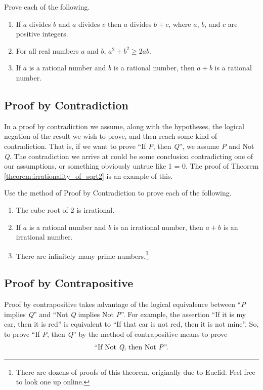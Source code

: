 \begin{exercise}
	\label{question:ex1}
	Prove each of the following.
	\begin{enumerate}
		\item If $a$ divides $b$ and $a$ divides $c$ then $a$ divides $b + c$, where $a$, $b$, and $c$ are positive integers.
		\item For all real numbers $a$ and $b$, $a^2 + b^2 \ge 2 a b$.
		\item If $a$ is a rational number and $b$ is a rational number, then $a+b$ is a rational number.
	\end{enumerate}
\end{exercise}



\subsection{Proof by Contradiction}
\label{section:proofByContradiction}
In a proof by contradiction we assume, along with the hypotheses, the logical negation of the result we wish to
prove, and then reach some kind of contradiction. That is, if we want to prove ``If \textit{P}, then \textit{Q}'', we assume \textit{P} and
Not \textit{Q}. The contradiction we arrive at could be some conclusion contradicting one of our assumptions, or
something obviously untrue like 1 = 0. The proof of Theorem \ref{theorem:irrationality_of_sqrt2} is an example of this.

\begin{exercise}
	\label{question:ex2}
	Use the method of Proof by Contradiction to prove each of the following.
	\begin{enumerate}
		\item The cube root of 2 is irrational.
		\item If $a$ is a rational number and $b$ is an irrational number, then $a+b$ is an irrational number.
		\item There are infinitely many prime numbers.\footnote{There are dozens of proofs of this theorem, originally due to Euclid. Feel free to look one up online.}
	\end{enumerate}
\end{exercise}




\subsection{Proof by Contrapositive}
\label{section:proofByContrapositive}
	Proof by contrapositive takes advantage of the logical equivalence between ``\textit{P} implies \textit{Q}'' and ``Not \textit{Q} implies Not \textit{P}''. For example, the assertion ``If it is my car, then it is red'' is equivalent to ``If that car is not red, then it is not mine''. So, to prove ``If \textit{P}, then \textit{Q}'' by the method of contrapositive means to prove
	\begin{align*}
		\mbox{``If Not \textit{Q}, then Not \textit{P}''.}
	\end{align*}

